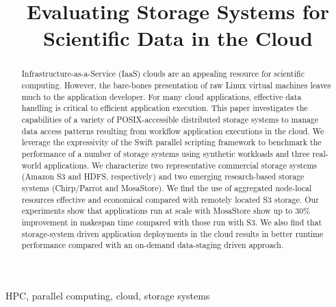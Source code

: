 \documentclass[10pt,journal,cspaper,compsoc]{IEEEtran}
\begin{document}
\title{Evaluating Storage Systems for Scientific Data in the Cloud}

\author{
}

\maketitle
\begin{abstract}
Infrastructure-as-a-Service (IaaS) clouds are an appealing resource for
scientific computing. 
%
However, the bare-bones presentation of raw Linux virtual machines leaves much
to the application developer.
%
For many cloud applications, effective data handling is critical to efficient
application execution.
%
This paper investigates the capabilities of a variety of POSIX-accessible
distributed storage systems to manage data access patterns resulting from
workflow application executions in the cloud.
%
We leverage the expressivity of the Swift parallel scripting framework to
benchmark the performance of a number of storage systems using synthetic
workloads and three real-world applications. We characterize two representative
commercial storage systems (Amazon S3 and HDFS, respectively) and two
emerging research-based storage systems (Chirp/Parrot and MosaStore). We find
the use of aggregated node-local resources effective and economical compared
with remotely located S3 storage. Our experiments show that applications run at
scale with MosaStore show up to 30\% improvement in makespan time compared with
those run with S3.
%
We also find that storage-system driven application deployments in the cloud
results in better runtime performance compared with an on-demand data-staging
driven approach.

%
\end{abstract}
\begin{IEEEkeywords}
HPC, parallel computing, cloud, storage systems
\end{IEEEkeywords}
\end{document}
